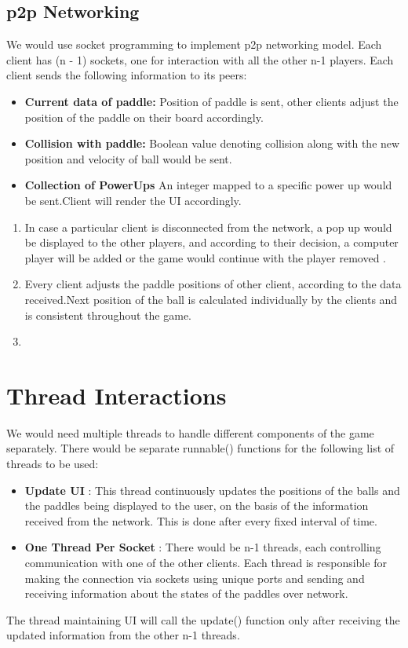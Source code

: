 \documentclass{article}
\begin{document}
			\subsection{p2p Networking}
			\par\noindent We would use socket programming to implement p2p networking model. Each client has (n - 1) sockets, one for interaction with all the other n-1 players. Each client sends the following information to its peers:
			\begin{itemize}
			\item \textbf{Current data of paddle:} Position of paddle is sent,  other clients adjust the position of the paddle on their board accordingly. 
			\item \textbf{Collision with paddle:} Boolean value denoting collision along with the new position and velocity of ball would be sent.
			\item \textbf{Collection of PowerUps} An integer mapped to a specific power up would be sent.Client will render the UI accordingly.
			\end{itemize}
				\begin{enumerate}
					\item In case a particular client is disconnected from the network, a pop up would be displayed to the other players, and according to their decision, a computer player will be added or the game would continue with the player removed .
					\item Every client adjusts the paddle positions of other client, according to the data received.Next position of the ball is calculated individually by the clients and is consistent throughout the game.
					\item  
				\end{enumerate}
			

	\section{Thread Interactions}
	\par\noindent We would need multiple threads to handle different components of the game separately. There would be separate runnable() functions for the following list of threads to be used:
	\begin{itemize}
	\item \textbf{Update UI} : This thread continuously updates the positions of the balls and the paddles being displayed to the user, on the basis of the information received from the network. This is done after every fixed interval of time.
	\item \textbf{One Thread Per Socket} : There would be n-1 threads, each controlling communication with one of the other clients. Each thread is responsible for making the connection via sockets using unique ports and sending and receiving information about the states of the paddles over network.
	\end{itemize}
	\par\noindent The thread maintaining UI will call the update() function only after receiving the updated information from the other n-1 threads.
\end{document}
